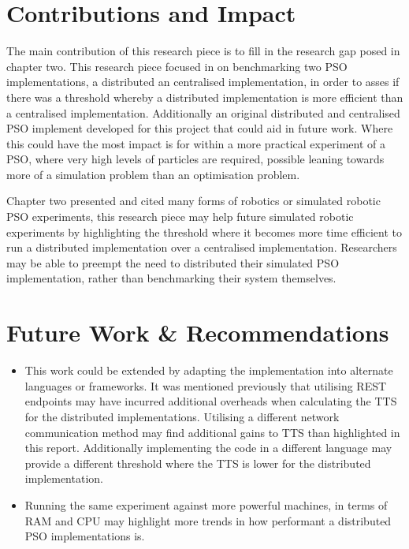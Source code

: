 \documentclass[oneside,12pt]{book}
\begin{document}
\section{Contributions and Impact}
The main contribution of this research piece is to fill in the research gap posed in chapter two. This research piece focused in on benchmarking two PSO implementations, a distributed an centralised implementation, in order to asses if there was a threshold whereby a distributed implementation is more efficient than a centralised implementation. Additionally an original distributed and centralised PSO implement developed for this project that could aid in future work. Where this could have the most impact is for within a more practical experiment of a PSO, where very high levels of particles are required, possible leaning towards more of a simulation problem than an optimisation problem.

Chapter two presented and cited many forms of robotics or simulated robotic PSO experiments, this research piece may help future simulated robotic experiments by highlighting the threshold where it becomes more time efficient to run a distributed implementation over a centralised implementation. Researchers may be able to preempt the need to distributed their simulated PSO implementation, rather than benchmarking their system themselves. 

\section{Future Work \& Recommendations}
\begin{itemize}
\item This work could be extended by adapting the implementation into alternate languages or frameworks. It was mentioned previously that utilising REST endpoints may have incurred additional overheads when calculating the TTS for the distributed implementations. Utilising a different network communication method may find additional gains to TTS than highlighted in this report. Additionally implementing the code in a different language may provide a different threshold where the TTS is lower for the distributed implementation.
\item  Running the same experiment against more powerful machines, in terms of RAM and CPU may highlight more trends in how performant a distributed PSO implementations is. 
\end{itemize}



\end{document}
